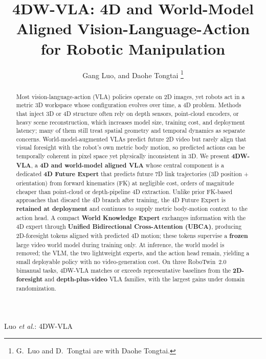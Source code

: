 \documentclass[journal]{IEEEtran}
\begin{document}
\title{4DW-VLA: 4D and World-Model Aligned Vision-Language-Action\\
       for Robotic Manipulation}

\author{Gang Luo, 
        and Daohe Tongtai%
\thanks{G.~Luo and D.~Tongtai are with Daohe Tongtai.}%
}

%
{Luo \MakeLowercase{\textit{et al.}}: 4DW-VLA}

\maketitle

\begin{abstract}
Most vision-language-action (VLA) policies operate on 2D images, yet
robots act in a metric 3D workspace whose configuration evolves over
time, a 4D problem. Methods that inject 3D or 4D structure often rely on
depth sensors, point-cloud encoders, or heavy scene reconstruction, which
increases model size, training cost, and deployment latency; many of them
still treat spatial geometry and temporal dynamics as separate concerns.
World-model-augmented VLAs predict future 2D video but rarely align that
visual foresight with the robot's own metric body motion, so predicted
actions can be temporally coherent in pixel space yet physically
inconsistent in 3D. We present \textbf{4DW-VLA}, a \textbf{4D and
world-model aligned VLA} whose central component is a dedicated
\textbf{4D Future Expert} that predicts future 7D link trajectories
(3D position + orientation) from forward kinematics (FK) at negligible
cost, orders of magnitude cheaper than point-cloud or depth-pipeline 4D
extraction. Unlike prior FK-based approaches that discard the 4D branch
after training, the 4D Future Expert is \textbf{retained at deployment}
and continues to supply metric body-motion context to the action head.
A compact \textbf{World Knowledge Expert} exchanges information with the
4D expert through \textbf{Unified Bidirectional Cross-Attention (UBCA)},
producing 2D-foresight tokens aligned with predicted 4D motion; these
tokens supervise a \textbf{frozen} large video world model during
training only. At inference, the world model is removed; the VLM, the two
lightweight experts, and the action head remain, yielding a small
deployable policy with no video-generation cost. On three RoboTwin~2.0 bimanual tasks, 4DW-VLA
matches or exceeds representative baselines from the \textbf{2D-foresight}
and \textbf{depth-plus-video} VLA families, with the largest gains under
domain randomization.
\end{abstract}
\end{document}
